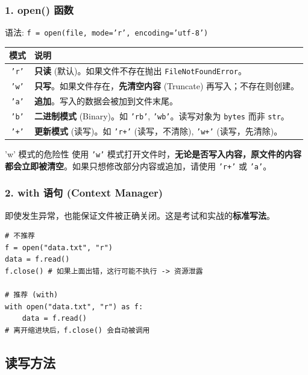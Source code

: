 \documentclass[12pt, a4paper]{article}
\begin{document}
\subsubsection{1. open() 函数}
语法: \texttt{f = open(file, mode='r', encoding='utf-8')}

\begin{table}[ht]
\centering
\begin{tabular}{c p{10cm}}
\toprule
\textbf{模式} & \textbf{说明} \\
\midrule
\texttt{'r'} & \textbf{只读} (默认)。如果文件不存在抛出 \texttt{FileNotFoundError}。 \\
\texttt{'w'} & \textbf{只写}。如果文件存在，\textbf{先清空内容} (Truncate) 再写入；不存在则创建。 \\
\texttt{'a'} & \textbf{追加}。写入的数据会被加到文件末尾。 \\
\texttt{'b'} & \textbf{二进制模式} (Binary)。如 \texttt{'rb'}, \texttt{'wb'}。读写对象为 \texttt{bytes} 而非 \texttt{str}。 \\
\texttt{'+'} & \textbf{更新模式} (读写)。如 \texttt{'r+'} (读写，不清除), \texttt{'w+'} (读写，先清除)。 \\
\bottomrule
\end{tabular}
\end{table}

\begin{trapbox}{'w' 模式的危险性}
使用 \texttt{'w'} 模式打开文件时，\textbf{无论是否写入内容，原文件的内容都会立即被清空}。如果只想修改部分内容或追加，请使用 \texttt{'r+'} 或 \texttt{'a'}。
\end{trapbox}

\subsubsection{2. with 语句 (Context Manager)}
即使发生异常，也能保证文件被正确关闭。这是考试和实战的\textbf{标准写法}。

\begin{lstlisting}[caption={自动关闭机制}]
# 不推荐
f = open("data.txt", "r")
data = f.read()
f.close() # 如果上面出错，这行可能不执行 -> 资源泄露

# 推荐 (with)
with open("data.txt", "r") as f:
    data = f.read()
# 离开缩进块后，f.close() 会自动被调用
\end{lstlisting}

\subsection{读写方法}
\end{document}
